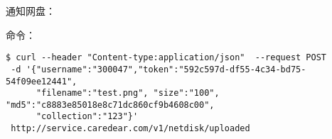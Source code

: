 \documentclass{beamer}
\begin{document}
\begin{frame}[fragile]

通知网盘：

命令：
\begin{lstlisting}[basicstyle=\tiny,frame=box]
$ curl --header "Content-type:application/json"  --request POST
 -d '{"username":"300047","token":"592c597d-df55-4c34-bd75-54f09ee12441",
      "filename":"test.png", "size":"100", "md5":"c8883e85018e8c71dc860cf9b4608c00",
      "collection":"123"}'
 http://service.caredear.com/v1/netdisk/uploaded 
\end{lstlisting}

\end{frame}
\end{document}

